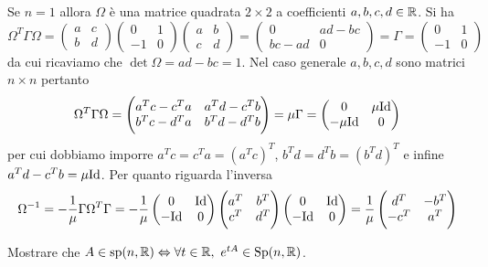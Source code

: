 \begin{solution}
    Se $ n = 1 $ allora $ \Omega $ è una matrice quadrata $ 2 \times 2 $ a coefficienti $ a, b, c, d \in \mathbb{R} $. Si ha
    \[
        \Omega^T \Gamma \Omega = 
        \begin{pmatrix}
        a & c \\
        b & d
        \end{pmatrix}
        \begin{pmatrix}
        0 & 1 \\
        -1 & 0
        \end{pmatrix}
        \begin{pmatrix}
        a & b \\
        c & d
        \end{pmatrix}
        =
        \begin{pmatrix}
        0 & ad - bc \\
        bc - ad & 0
        \end{pmatrix}
        =
        \Gamma =
        \begin{pmatrix}
        0 & 1 \\
        -1 & 0
        \end{pmatrix}
    \]
    da cui ricaviamo che $ \det{\Omega} = ad - bc = 1 $. Nel caso generale $ a, b, c, d $ sono matrici $ n \times n $ pertanto
    \[
    \Omega^T \Gamma \Omega =
    \begin{pmatrix}
    a^T c - c^T a & a^T d - c^T b \\
    b^T c - d^T a & b^T d - d^T b
    \end{pmatrix}
    =
    \mu \Gamma
    =
    \begin{pmatrix}
    	0        & \mu \mathrm{Id} \\
    	-\mu \mathrm{Id} & 0
    \end{pmatrix}
    \]
    per cui dobbiamo imporre $ a^T c = c^T a = (a^T c)^T $, $ b^T d = d^T b = (b^T d)^T $ e infine $ a^T d - c^T b = \mu \mathrm{Id} $. Per quanto riguarda l'inversa
    \[
        \Omega^{-1} = - \frac{1}{\mu} \Gamma \Omega^T \Gamma =
        - \frac{1}{\mu}
        \begin{pmatrix}
        	0    & \mathrm{Id} \\
        	-\mathrm{Id} & 0
        \end{pmatrix}
        \begin{pmatrix}
        	a^T & b^T \\
        	c^T & d^T
        \end{pmatrix}
        \begin{pmatrix}
        	0    & \mathrm{Id} \\
        	-\mathrm{Id} & 0
        \end{pmatrix}
        =
        \dfrac{1}{\mu} 
        \begin{pmatrix}
        	d^T  & -b^T \\
        	-c^T & a^T
        \end{pmatrix}
    \]
\end{solution}

\begin{exercise}
    Mostrare che $ A \in \mathrm{sp}(n, \mathbb{R}) \Leftrightarrow \forall t \in \mathbb{R}, \ e^{tA} \in \mathrm{Sp}(n, \mathbb{R}) $.
\end{exercise}